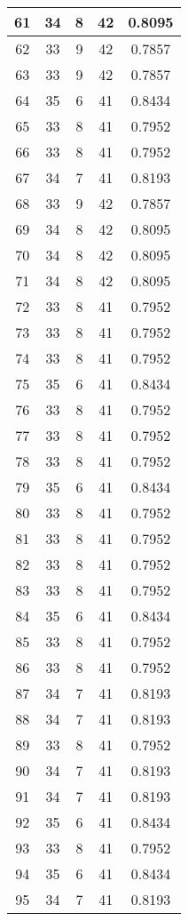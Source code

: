 \documentclass[letterpaper, 12pt]{article}
\begin{document}
\begin{longtable}{|c|c|c|c|c|}
61 & 34 & 8 & 42 & 0.8095 \\
\hline
62 & 33 & 9 & 42 & 0.7857 \\
\hline
63 & 33 & 9 & 42 & 0.7857 \\
\hline
64 & 35 & 6 & 41 & 0.8434 \\
\hline
65 & 33 & 8 & 41 & 0.7952 \\
\hline
66 & 33 & 8 & 41 & 0.7952 \\
\hline
67 & 34 & 7 & 41 & 0.8193 \\
\hline
68 & 33 & 9 & 42 & 0.7857 \\
\hline
69 & 34 & 8 & 42 & 0.8095 \\
\hline
70 & 34 & 8 & 42 & 0.8095 \\
\hline
71 & 34 & 8 & 42 & 0.8095 \\
\hline
72 & 33 & 8 & 41 & 0.7952 \\
\hline
73 & 33 & 8 & 41 & 0.7952 \\
\hline
74 & 33 & 8 & 41 & 0.7952 \\
\hline
75 & 35 & 6 & 41 & 0.8434 \\
\hline
76 & 33 & 8 & 41 & 0.7952 \\
\hline
77 & 33 & 8 & 41 & 0.7952 \\
\hline
78 & 33 & 8 & 41 & 0.7952 \\
\hline
79 & 35 & 6 & 41 & 0.8434 \\
\hline
80 & 33 & 8 & 41 & 0.7952 \\
\hline
81 & 33 & 8 & 41 & 0.7952 \\
\hline
82 & 33 & 8 & 41 & 0.7952 \\
\hline
83 & 33 & 8 & 41 & 0.7952 \\
\hline
84 & 35 & 6 & 41 & 0.8434 \\
\hline
85 & 33 & 8 & 41 & 0.7952 \\
\hline
86 & 33 & 8 & 41 & 0.7952 \\
\hline
87 & 34 & 7 & 41 & 0.8193 \\
\hline
88 & 34 & 7 & 41 & 0.8193 \\
\hline
89 & 33 & 8 & 41 & 0.7952 \\
\hline
90 & 34 & 7 & 41 & 0.8193 \\
\hline
91 & 34 & 7 & 41 & 0.8193 \\
\hline
92 & 35 & 6 & 41 & 0.8434 \\
\hline
93 & 33 & 8 & 41 & 0.7952 \\
\hline
94 & 35 & 6 & 41 & 0.8434 \\
\hline
95 & 34 & 7 & 41 & 0.8193 \\

\end{longtable}
\end{document}

